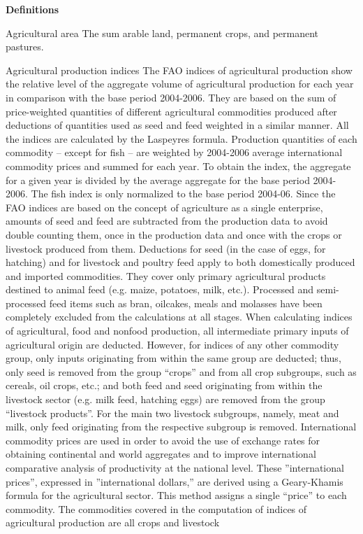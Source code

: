 \begin{MetadataCollection} {}

\twocolumn

\LARGE

\textbf{Definitions}

\footnotesize

\begin{metadata}{Agricultural area}{} {}
The sum arable land, permanent crops, and permanent pastures.
\end{metadata}

\begin{metadata}{Agricultural production indices} {}
The FAO indices of agricultural production show the relative level of the aggregate volume of agricultural production for each year in comparison with the base period 2004-2006. They are based on the sum of price-weighted quantities of different agricultural commodities produced after deductions of quantities used as seed and feed weighted in a similar manner. All the indices are calculated by the Laspeyres formula. Production quantities of each commodity – except for fish – are weighted by 2004-2006 average international commodity prices and summed for each year. To obtain the index, the aggregate for a given year is divided by the average aggregate for the base period 2004-2006. The fish index is only normalized to the base period 2004-06. Since the FAO indices are based on the concept of agriculture as a single enterprise, amounts of seed and feed are subtracted from the production data to avoid double counting them, once in the production data and once with the crops or livestock produced from them. Deductions for seed (in the case of eggs, for hatching) and for livestock and poultry feed apply to both domestically produced and imported commodities. They cover only primary agricultural products destined to animal feed (e.g. maize, potatoes, milk, etc.). Processed and semi-processed feed items such as bran, oilcakes, meals and molasses have been completely excluded from the calculations at all stages. When calculating indices of agricultural, food and nonfood production, all intermediate primary inputs of agricultural origin are deducted. However, for indices of any other commodity group, only inputs originating from within the same group are deducted; thus, only seed is removed from the group “crops” and from all crop subgroups, such as cereals, oil crops, etc.; and both feed and seed originating from within the livestock sector (e.g. milk feed, hatching eggs) are removed from the group “livestock products”. For the main two livestock subgroups, namely, meat and milk, only feed originating from the respective subgroup is removed. International commodity prices are used in order to avoid the use of exchange rates for obtaining continental and world aggregates and to improve international comparative analysis of productivity at the national level. These ”international prices”, expressed in ”international dollars,” are derived using a Geary-Khamis formula for the agricultural sector. This method assigns a single “price” to each commodity. The commodities covered in the computation of indices of agricultural production are all crops and livestock 
\end{metadata}
\end{MetadataCollection}
